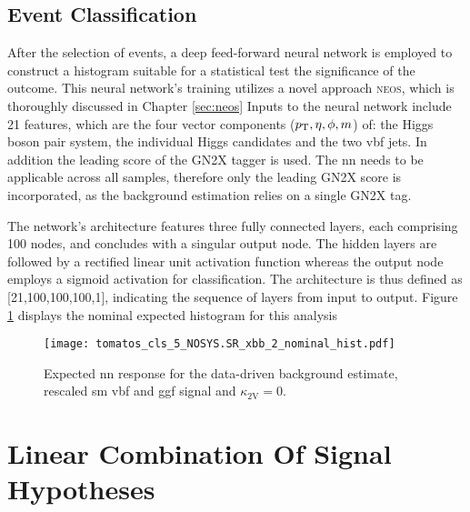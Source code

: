 \subsection{Event Classification}
After the selection of events, a deep feed-forward neural network is employed to construct a histogram suitable for a statistical test the significance of the outcome. This neural network's training utilizes a novel approach \textsc{neos}, which is thoroughly discussed in Chapter \ref{sec:neos} %
Inputs to the neural network include 21 features, which are the four vector components ($p_{\text{T}},\eta,\phi,m$) of: the Higgs boson pair system, the individual Higgs candidates and the two \ac{vbf} jets. In addition the leading score of the GN2X tagger is used. The \ac{nn} needs to be applicable across all samples, therefore only the leading GN2X score is incorporated, as the background estimation relies on a single GN2X tag.

The network's architecture features three fully connected layers, each comprising 100 nodes, and concludes with a singular output node. The hidden layers are followed by a rectified linear unit activation function whereas the output node employs a sigmoid activation for classification. The architecture is thus defined as [21,100,100,100,1], indicating the sequence of layers from input to output. Figure \ref{fig:nominal-hist} displays the nominal expected histogram for this analysis

\begin{figure}
    \centering
    \texttt{[image: tomatos\_cls\_5\_NOSYS.SR\_xbb\_2\_nominal\_hist.pdf]}
    \caption[]{Expected \ac{nn} response for the data-driven background estimate, rescaled \ac{sm}  \ac{vbf} and \ac{ggf} signal and $\kappa_\text{2V}=0$.}
    \label{fig:nominal-hist}
\end{figure}


\section{Linear Combination Of Signal Hypotheses}\label{sec:linear_combination}

